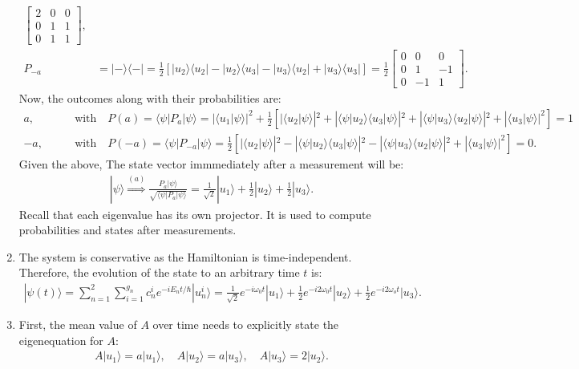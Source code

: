 \documentclass[letterpaper,11pt,twoside]{article}
\newcommand{\ket}[1]{|#1\rangle}
\newcommand{\bra}[1]{\langle#1|}
\newcommand{\braket}[1]{\langle#1\rangle}
\begin{document}
\begin{enumerate}[itemsep=0pt,topsep=0pt,label=\alph*.]
\begin{align*}
\begin{bmatrix}
      2&0&0\\0&1&1\\0&1&1
    \end{bmatrix},\\
    P_{-a}&=\ket{-}\bra{-}=\frac{1}{2}[\ket{u_2}\bra{u_2}-\ket{u_2}\bra{u_3}-\ket{u_3}\bra{u_2}+\ket{u_3}\bra{u_3}]=\frac{1}{2}\begin{bmatrix}
      0&0&0\\0&1&-1\\0&-1&1
    \end{bmatrix}.
  \end{align*}
  Now, the outcomes along with their probabilities are:
  {\small
  \begin{align*}
    a,&\qquad\text{with}\quad P(a)=\braket{\psi|P_a|\psi}=|\braket{u_1|\psi}|^2+\frac{1}{2}\left[|\braket{u_2|\psi}|^2+|\braket{\psi|u_2}\braket{u_3|\psi}|^2+|\braket{\psi|u_3}\braket{u_2|\psi}|^2+|\braket{u_3|\psi}|^2\right]=1\\
    -a,&\qquad\text{with}\quad P(-a)=\braket{\psi|P_{-a}|\psi}=\frac{1}{2}\left[|\braket{u_2|\psi}|^2-|\braket{\psi|u_2}\braket{u_3|\psi}|^2-|\braket{\psi|u_3}\braket{u_2|\psi}|^2+|\braket{u_3|\psi}|^2\right]=0.
  \end{align*}}
  Given the above, The state vector immmediately after a measurement will be:
  \begin{align*}
    \ket{\psi}\stackrel{(a)}{\Longrightarrow}\frac{P_a\ket{\psi}}{\sqrt{\braket{\psi|P_a|\psi}}}=\frac{1}{\sqrt{2}}\ket{u_1}+\frac{1}{2}\ket{u_2}+\frac{1}{2}\ket{u_3}.
  \end{align*}
  Recall that each eigenvalue has its own projector. It is used to compute probabilities and states after measurements.
  \item The system is conservative as the Hamiltonian is time-independent. Therefore, the evolution of the state to an arbitrary time $t$ is:
  \begin{align*}
    \ket{\psi(t)}=\sum_{n=1}^2\sum_{i=1}^{g_n}c_{n}^ie^{-iE_nt/\hbar}\ket{u_n^i}=\frac{1}{\sqrt{2}}e^{-i\omega_0t}\ket{u_1}+\frac{1}{2}e^{-i2\omega_0t}\ket{u_2}+\frac{1}{2}e^{-i2\omega_ot}\ket{u_3}.
  \end{align*}
  \item First, the mean value of $A$ over time needs to explicitly state the eigenequation for $A$:
  \begin{align*}
    A\ket{u_1}=a\ket{u_1},\quad A\ket{u_2}=a\ket{u_3},\quad A\ket{u_3}=2\ket{u_2}.
  \end{align*}
  \begin{align*}

\end{align*}
\end{enumerate}
\end{document}
